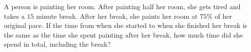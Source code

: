 A person is painting her room. After painting half her room, she gets tired and takes a $15$ minute break. After her break, she paints her room at $75\%$ of her original pace. If the time from when she started to when she finished her break is the same as the time she spent painting after her break, how much time did she spend in total, including the break?
